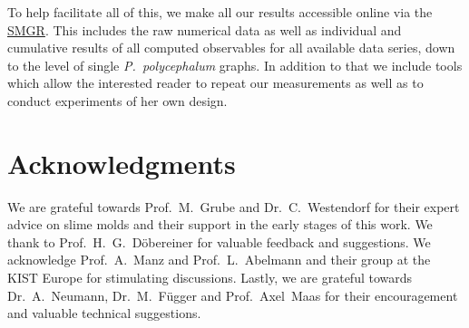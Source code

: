 			To help facilitate all of this, we make all our results accessible online via the \href{http://smgr.mpi-inf.mpg.de}{SMGR}. This includes the raw numerical data as well as individual and cumulative results of all computed observables for all available data series, down to the level of single \emph{P.~polycephalum} graphs. In addition to that we include tools which allow the interested reader to repeat our measurements as well as to conduct experiments of her own design.

	\section{Acknowledgments}

		We are grateful towards Prof.~M.~Grube and Dr.~C.~Westendorf for their expert advice on slime molds and their support in the early stages of this work. We thank to Prof.~H.~G.~D\"obereiner for valuable feedback and suggestions. We acknowledge Prof.~A.~Manz and Prof.~L.~Abelmann and their group at the KIST Europe for stimulating discussions. Lastly, we are grateful towards Dr.~A.~Neumann, Dr.~M.~F\"ugger and Prof.~Axel~Maas for their encouragement and valuable technical suggestions.